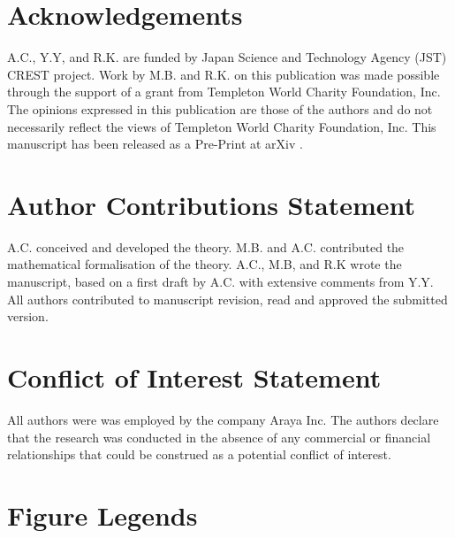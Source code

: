 \documentclass[utf8]{article}
\begin{document}
	\section*{Acknowledgements}
	A.C., Y.Y, and R.K. are funded by Japan Science and Technology Agency (JST) CREST project. Work by M.B. and R.K. on this publication was made possible through the support of a grant from Templeton World Charity Foundation, Inc. The opinions expressed in this publication are those of the authors and do not necessarily reflect the views of Templeton World Charity Foundation, Inc. This manuscript has been released as a Pre-Print at arXiv \citep{chang2019information}.


    \section*{Author Contributions Statement}
    A.C. conceived and developed the theory. M.B. and A.C. contributed the mathematical formalisation of the theory. A.C., M.B, and R.K wrote the manuscript, based on a first draft by A.C. with extensive comments from Y.Y. All authors contributed to manuscript revision, read and approved the submitted version.

    \section*{Conflict of Interest Statement}
    All authors were was employed by the company Araya Inc. The authors declare that the research was conducted in the absence of any commercial or financial relationships that could be construed as a potential conflict of interest.





	
	
	
	\section*{Figure Legends}
	\renewcommand{\listfigurename}{~}
    \listoffigures
\end{document}
